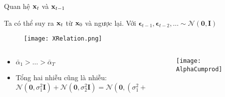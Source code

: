\begin{frame}{Quan hệ $\mathbf{x}_t$ và $\mathbf{x}_{t - 1}$}
	
	Ta có thể suy ra $\mathbf{x}_t$ từ $\mathbf{x}_0$ và ngược lại. Với $ \boldsymbol{\epsilon}_{t-1}, \boldsymbol{\epsilon}_{t-2}, \dots \sim \mathcal{N}(\mathbf{0}, \mathbf{I})$
	\vspace{-10pt}
	
	\begin{figure}
		\centering
		\texttt{[image: XRelation.png]}
	\end{figure}
	\begin{columns}
		\begin{column}{0.5\textwidth}
			\begin{itemize}
				\item $\bar{\alpha}_1 > \dots > \bar{\alpha}_T$
				\item Tổng hai nhiễu cũng là nhiễu:
				\footnotesize
				$$
				\mathcal{N}(\mathbf{0}, \sigma_1^2\mathbf{I}) + 
				\mathcal{N}(\mathbf{0}, \sigma_2^2\mathbf{I})
				=\mathcal{N}(\mathbf{0}, (\sigma_1^2 + \sigma_2^2)\mathbf{I})
				$$
			\end{itemize}
		\end{column}
		\begin{column}{0.5\textwidth}
			
			\begin{figure}
				\centering
				\texttt{[image: AlphaCumprod]}
			\end{figure}
			
			
		\end{column}
	\end{columns}
	
\end{frame}


